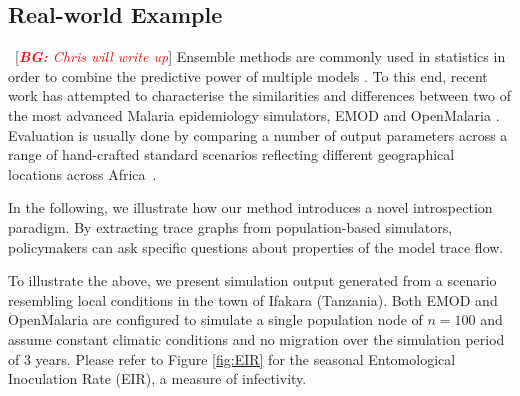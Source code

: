 \documentclass{article}
\newcommand{\bg}[1]{~{{[{\it \textcolor{red}{{\bf BG:} #1}}]}}}
\begin{document}
\subsection{Real-world Example}
\label{sec:casestudy}

\bg{Chris will write up}
Ensemble methods are commonly used in statistics in order to combine the predictive power of multiple models \cite{cameron2015defining,smith_ensemble_2012}. To this end, recent work has attempted to characterise the similarities and differences between two of the most advanced Malaria epidemiology simulators, EMOD \cite{bershteyn2018implementation} and OpenMalaria \cite{smith2008towards}. Evaluation is usually done by comparing a number of output parameters across a range of hand-crafted standard scenarios reflecting different geographical locations across Africa~\cite{smith_ensemble_2012}.

In the following, we illustrate how our method introduces a novel introspection paradigm. By extracting trace graphs from population-based simulators, policymakers can ask specific questions about properties of the model trace flow. 

To illustrate the above, we present simulation output generated from a scenario resembling local conditions in the town of Ifakara (Tanzania). Both EMOD and OpenMalaria are configured to simulate a single population node of $n=100$ and assume constant climatic conditions and no migration over the simulation period of $3$ years. Please refer to Figure \ref{fig:EIR} for the seasonal Entomological Inoculation Rate (EIR), a measure of infectivity.
\end{document}
